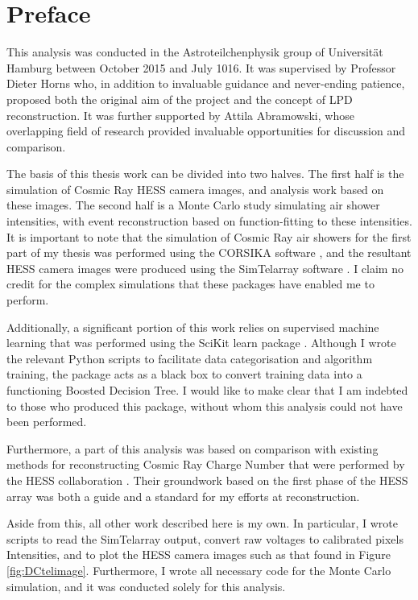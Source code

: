 \documentclass[11pt]{article}
\begin{document}
\section{Preface}
This analysis was conducted in the Astroteilchenphysik group of Universit\"{a}t Hamburg between October 2015 and July 1016. It was supervised by Professor Dieter Horns who, in addition to invaluable guidance and never-ending patience, proposed both the original aim of the project and the concept of LPD reconstruction. It was further supported by Attila Abramowski, whose overlapping field of research provided invaluable opportunities for discussion and comparison. 

The basis of this thesis work can be divided into two halves. The first half is the simulation of Cosmic Ray HESS camera images, and analysis work based on these images. The second half is a Monte Carlo study simulating air shower intensities, with event reconstruction based on function-fitting to these intensities. It is important to note that the simulation of Cosmic Ray air showers for the first part of my thesis was performed using the CORSIKA software \cite{Heck98}, and the resultant HESS camera images were produced using the Sim\textunderscore Telarray software \cite{Bernlohr08}. I claim no credit for the complex simulations that these packages have enabled me to perform. 

Additionally, a significant portion of this work relies on supervised machine learning that was performed using the SciKit learn package \cite{scikit-learn}. Although I wrote the relevant Python scripts to facilitate data categorisation and algorithm training, the package acts as a black box to convert training data into a functioning Boosted Decision Tree. I would like to make clear that I am indebted to those who produced this package, without whom this analysis could not have been performed.

Furthermore, a part of this analysis was based on comparison with existing methods for reconstructing Cosmic Ray Charge Number that were performed by the HESS collaboration \cite{hess07}. Their groundwork based on the first phase of the HESS array was both a guide and a standard for my efforts at reconstruction.

Aside from this, all other work described here is my own. In particular, I wrote scripts to read the Sim\textunderscore Telarray output, convert raw voltages to calibrated pixels Intensities, and to plot the HESS camera images such as that found in Figure \ref{fig:DCtelimage}. Furthermore, I wrote all necessary code for the Monte Carlo simulation, and it was conducted solely for this analysis. 
\newpage
\end{document}
